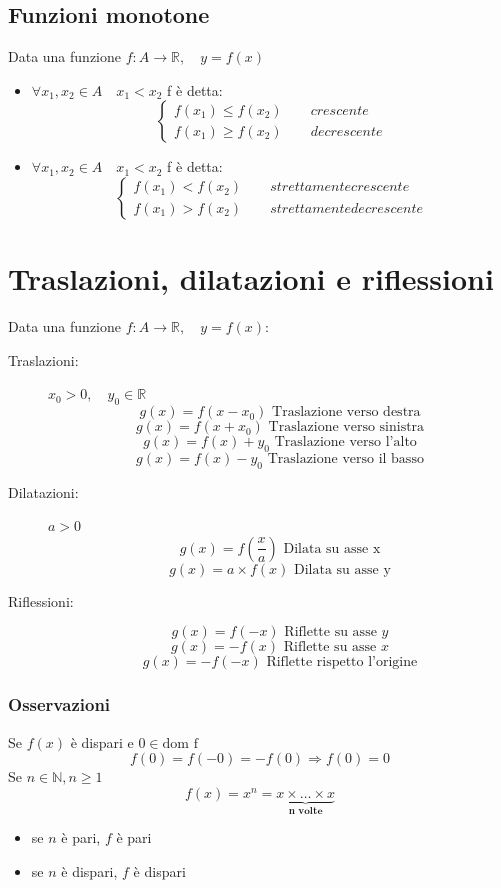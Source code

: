 \documentclass[11pt,a4paper,notitlepage]{report}
\let\numberset\mathbb
\newcommand{\N}{\numberset{N}}
\newcommand{\R}{\numberset{R}}
\begin{document}
\subsection{Funzioni monotone}
Data una funzione $f: A \rightarrow \R , \quad y=f(x)$
\begin{itemize}
	\item $\forall x_1, x_2 \in A \quad x_1<x_2$ f è detta:
	\[\begin{cases}
		f(x_1) \leq f(x_2) \qquad crescente\\
		f(x_1) \geq f(x_2) \qquad decrescente
	\end{cases}
	\]
	\item $\forall x_1, x_2 \in A \quad x_1<x_2$ f è detta:
	\[\begin{cases}
		f(x_1) < f(x_2) \qquad strettamente crescente\\
		f(x_1) > f(x_2) \qquad strettamente decrescente
	\end{cases}
	\]
\end{itemize}


\section{Traslazioni, dilatazioni e riflessioni}
Data una funzione $f: A \rightarrow \R , \quad y=f(x)$:
\begin{description}
	\item[Traslazioni:] $x_0 > 0, \quad y_0 \in \R$
		\[g(x)=f(x-x_0) \text{ Traslazione verso destra}\]
		\[g(x)=f(x+x_0) \text{ Traslazione verso sinistra}\]
		\[g(x)=f(x)+y_0 \text{ Traslazione verso l'alto}\]
		\[g(x)=f(x)-y_0 \text{ Traslazione verso il basso}\]
	\item[Dilatazioni:] $a>0$
		\[g(x)=f(\frac{x}{a}) \text{ Dilata su asse x}\]
		\[g(x)=a\times f(x) \text{ Dilata su asse y}\]
	\item[Riflessioni:]
		\[g(x)=f(-x) \text{ Riflette su asse }y\]
		\[g(x)=-f(x) \text{ Riflette su asse }x\]
		\[g(x)=-f(-x) \text{ Riflette rispetto l'origine}\]
\end{description}


\subsubsection{Osservazioni}
Se $f(x)$ è dispari e $0 \in \text{dom f}$
\[f(0)=f(-0)=-f(0)\Rightarrow f(0)=0\]
\newline
Se $n \in \N, n \geq 1$
\[f(x)=x^n= \underbrace{x \times \dots \times x}_{\textbf{n volte}}\]
\begin{itemize}
	\item se $n$ è pari, $f$ è pari
	\item se $n$ è dispari, $f$ è dispari
\end{itemize}
\end{document}
